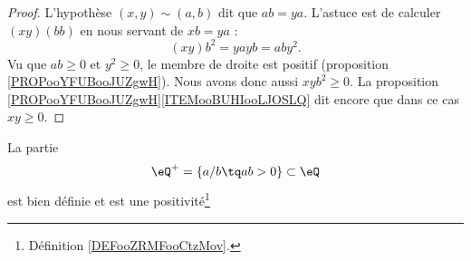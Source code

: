 \begin{proof}
	L'hypothèse \( (x,y)\sim (a,b)\) dit que \( ab=ya\). L'astuce est de calculer \( (xy)(bb)\) en nous servant de \( xb=ya\) :
	\begin{equation}
		(xy)b^2=yayb=aby^2.
	\end{equation}
	Vu que \( ab\geq 0\) et \( y^2\geq 0\), le membre de droite est positif (proposition \ref{PROPooYFUBooJUZgwH}). Nous avons donc aussi \( xyb^2\geq 0\). La proposition \ref{PROPooYFUBooJUZgwH}\ref{ITEMooBUHIooLJOSLQ} dit encore que dans ce cas \( xy\geq 0\).
\end{proof}


\begin{proposition}	\label{PROPooEOZWooLxRPXa}
	La partie
	\begin{equation}
		\eQ^+=\{ a/b\tq ab>0 \}\subset \eQ
	\end{equation}
	est bien définie et est une positivité\footnote{Définition \ref{DEFooZRMFooCtzMov}.}
\end{proposition}


